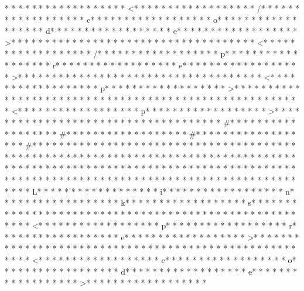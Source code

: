 * * *  * * *  * * *  *  * * *  *  * * *  * <* * *  * * *  * * *  *  * * *  *  * * *  * /* * *  * * *  * * *  *  * * *  *  * * *  * c* * *  * * *  * * *  *  * * *  *  * * *  * o* * *  * * *  * * *  *  * * *  *  * * *  * d* * *  * * *  * * *  *  * * *  *  * * *  * e* * *  * * *  * * *  *  * * *  *  * * *  * >* * *  * * *  * * *  *  * * *  *  * * *  * 
* * *  * * *  * * *  *  * * *  *  * * *  * <* * *  * * *  * * *  *  * * *  *  * * *  * /* * *  * * *  * * *  *  * * *  *  * * *  * p* * *  * * *  * * *  *  * * *  *  * * *  * r* * *  * * *  * * *  *  * * *  *  * * *  * e* * *  * * *  * * *  *  * * *  *  * * *  * >* * *  * * *  * * *  *  * * *  *  * * *  * 
* * *  * * *  * * *  *  * * *  *  * * *  * <* * *  * * *  * * *  *  * * *  *  * * *  * p* * *  * * *  * * *  *  * * *  *  * * *  * >* * *  * * *  * * *  *  * * *  *  * * *  * 
* * *  * * *  * * *  *  * * *  *  * * *  * 
* * *  * * *  * * *  *  * * *  *  * * *  * <* * *  * * *  * * *  *  * * *  *  * * *  * p* * *  * * *  * * *  *  * * *  *  * * *  * >* * *  * * *  * * *  *  * * *  *  * * *  * 
* * *  * * *  * * *  *  * * *  *  * * *  * #* * *  * * *  * * *  *  * * *  *  * * *  * #* * *  * * *  * * *  *  * * *  *  * * *  * #* * *  * * *  * * *  *  * * *  *  * * *  * #* * *  * * *  * * *  *  * * *  *  * * *  *  * * *  * * *  * * *  *  * * *  *  * * *  * * *  * * *  *  * * *  *  * * *  * * *  * * *  *  * * *  *  * * *  *  * * *  * * *  * * *  *  * * *  *  * * *  *  * * *  * * *  * * *  *  * * *  *  * * *  *  * * *  * * *  * * *  *  * * *  *  * * *  *  * * *  * * *  * * *  *  * * *  *  * * *  *  * * *  * * *  * * *  *  * * *  *  * * *  * {* * *  * * *  * * *  *  * * *  *  * * *  * L* * *  * * *  * * *  *  * * *  *  * * *  * i* * *  * * *  * * *  *  * * *  *  * * *  * n* * *  * * *  * * *  *  * * *  *  * * *  * k* * *  * * *  * * *  *  * * *  *  * * *  * s* * *  * * *  * * *  *  * * *  *  * * *  * }* * *  * * *  * * *  *  * * *  *  * * *  * 
* * *  * * *  * * *  *  * * *  *  * * *  * <* * *  * * *  * * *  *  * * *  *  * * *  * p* * *  * * *  * * *  *  * * *  *  * * *  * r* * *  * * *  * * *  *  * * *  *  * * *  * e* * *  * * *  * * *  *  * * *  *  * * *  * >* * *  * * *  * * *  *  * * *  *  * * *  * 
* * *  * * *  * * *  *  * * *  *  * * *  * 	* * *  * * *  * * *  *  * * *  *  * * *  * <* * *  * * *  * * *  *  * * *  *  * * *  * c* * *  * * *  * * *  *  * * *  *  * * *  * o* * *  * * *  * * *  *  * * *  *  * * *  * d* * *  * * *  * * *  *  * * *  *  * * *  * e* * *  * * *  * * *  *  * * *  *  * * *  * >* * *  * * *  * * *  *  * * *  *  * * *  * 
